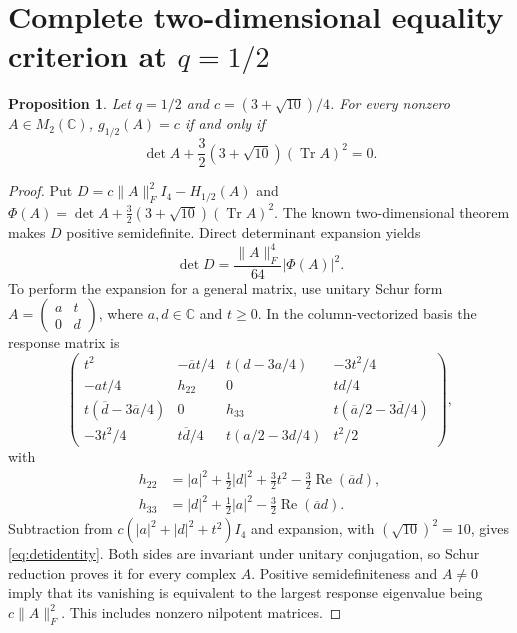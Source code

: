 \documentclass[11pt,a4paper]{article}
\newcommand{\Tr}{\operatorname{Tr}}
\newcommand{\norm}[1]{\lVert #1\rVert_F}
\newtheorem{proposition}[theorem]{Proposition}
\begin{document}
\section{Complete two-dimensional equality criterion at \texorpdfstring{\(q=1/2\)}{q=1/2}}
\label{app:equality}
\begin{proposition}
Let \(q=1/2\) and \(c=(3+\sqrt{10})/4\).
For every nonzero \(A\in M_2(\mathbb C)\),
\(g_{1/2}(A)=c\) if and only if
\begin{equation}
 \det A+\frac32(3+\sqrt{10})(\Tr A)^2=0.
 \label{eq:auxcriterion}
\end{equation}
\end{proposition}
\begin{proof}
Put \(D=c\norm{A}^2I_4-H_{1/2}(A)\) and
\(\Phi(A)=\det A+\tfrac32(3+\sqrt{10})(\Tr A)^2\).
The known two-dimensional theorem makes \(D\) positive
semidefinite. Direct determinant expansion yields
\begin{equation}
 \det D=\frac{\norm{A}^4}{64}|\Phi(A)|^2.
 \label{eq:detidentity}
\end{equation}
To perform the expansion for a general matrix, use unitary
Schur form \(A=\left(\begin{smallmatrix}a&t\\0&d\end{smallmatrix}\right)\),
where \(a,d\in\mathbb C\) and \(t\geq0\).
In the column-vectorized basis the response matrix is
\begin{equation}
 \begin{pmatrix}
 t^2 &-\overline a t/4&t(d-3a/4)&-3t^2/4\\
 -at/4&h_{22}&0&td/4\\
 t(\overline d-3\overline a/4)&0&h_{33}&
                         t(\overline a/2-3\overline d/4)\\
 -3t^2/4&t\overline d/4&t(a/2-3d/4)&t^2/2
 \end{pmatrix},
 \label{eq:schurH}
\end{equation}
with
\begin{align*}
 h_{22}&=|a|^2+\tfrac12|d|^2+\tfrac32t^2
                -\tfrac32\operatorname{Re}(\overline a d),\\
 h_{33}&=|d|^2+\tfrac12|a|^2
                -\tfrac32\operatorname{Re}(\overline a d).
\end{align*}
Subtraction from \(c(|a|^2+|d|^2+t^2)I_4\)
and expansion, with \((\sqrt{10})^2=10\), gives
\eqref{eq:detidentity}. Both sides are invariant under
unitary conjugation, so Schur reduction proves it for
every complex \(A\). Positive semidefiniteness and
\(A\neq0\) imply that its vanishing is equivalent
to the largest response eigenvalue being
\(c\norm{A}^2\). This includes nonzero nilpotent matrices.
\end{proof}
\end{document}
